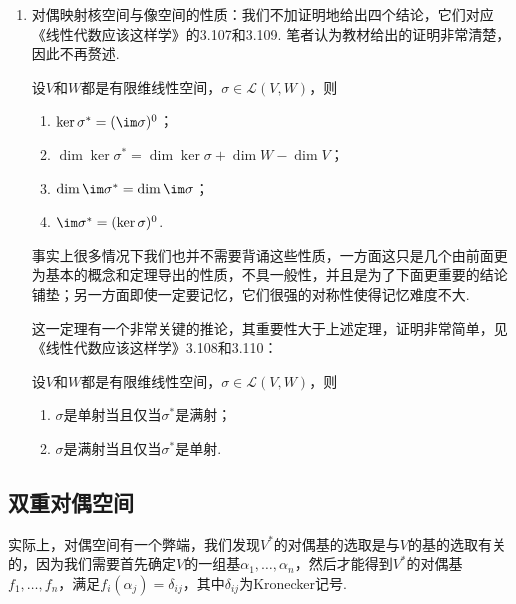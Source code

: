 \begin{enumerate}
    \item 对偶映射核空间与像空间的性质：我们不加证明地给出四个结论，它们对应《线性代数应该这样学》的3.107和3.109. 笔者认为教材给出的证明非常清楚，因此不再赘述.
          \begin{theorem}\label{thm:9:对偶映射像和核的性质}
              设$V$和$W$都是有限维线性空间，$\sigma\in\mathcal{L}(V,W)$，则
              \begin{enumerate}
                  \item $\ker\sigma^*=(\im\sigma)^0$；

                  \item $\dim\ker\sigma^*=\dim\ker\sigma+\dim W-\dim V$；

                  \item $\dim\im\sigma^*=\dim\im\sigma$；

                  \item $\im\sigma^*=(\ker\sigma)^0$.
              \end{enumerate}
          \end{theorem}

          事实上很多情况下我们也并不需要背诵这些性质，一方面这只是几个由前面更为基本的概念和定理导出的性质，不具一般性，并且是为了下面更重要的结论铺垫；另一方面即使一定要记忆，它们很强的对称性使得记忆难度不大.

          这一定理有一个非常关键的推论，其重要性大于上述定理，证明非常简单，见《线性代数应该这样学》3.108和3.110：
          \begin{corollary}\label{cor:9:对偶映射单满射}
              设$V$和$W$都是有限维线性空间，$\sigma\in\mathcal{L}(V,W)$，则
              \begin{enumerate}
                  \item $\sigma$是单射当且仅当$\sigma^*$是满射；

                  \item $\sigma$是满射当且仅当$\sigma^*$是单射.
              \end{enumerate}
          \end{corollary}
\end{enumerate}

\subsection{双重对偶空间}

实际上，对偶空间有一个弊端，我们发现$V^*$的对偶基的选取是与$V$的基的选取有关的，因为我们需要首先确定$V$的一组基$\alpha_1,\ldots,\alpha_n$，然后才能得到$V^*$的对偶基$f_1,\ldots,f_n$，满足$f_i(\alpha_j)=\delta_{ij}$，其中$\delta_{ij}$为Kronecker记号.

